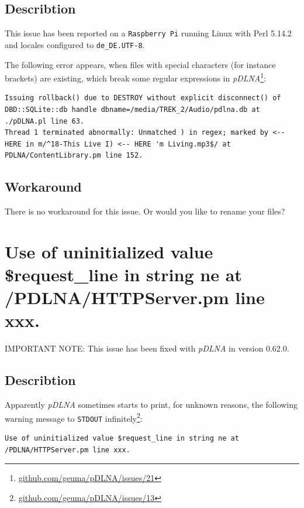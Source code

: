 \documentclass[a4paper,oneside,10pt]{report}
\newenvironment{colframeimportantnote}{%
  \begin{Sbox}
    \begin{minipage}{.99\columnwidth}
}{%
  \end{minipage}
  \end{Sbox}
  \begin{center}
    \fcolorbox{black}{Orange}{\TheSbox}
  \end{center}
}
\begin{document}
\subsection{Describtion}

This issue has been reported on a \verb|Raspberry Pi| running Linux with Perl 5.14.2 and locales configured to \verb|de_DE.UTF-8|.

The following error appears, when files with special characters (for instance brackets) are existing, which break some regular expressions in {\em pDLNA}\footnote{\url{github.com/geuma/pDLNA/issues/21}}:
\begin{lstlisting}
Issuing rollback() due to DESTROY without explicit disconnect() of DBD::SQLite::db handle dbname=/media/TREK_2/Audio/pdlna.db at ./pDLNA.pl line 63.
Thread 1 terminated abnormally: Unmatched ) in regex; marked by <-- HERE in m/^18-This Live I) <-- HERE 'm Living.mp3$/ at PDLNA/ContentLibrary.pm line 152.
\end{lstlisting}

\subsection{Workaround}

There is no workaround for this issue. Or would you like to rename your files?

\section{Use of uninitialized value \$request\_line in string ne at /PDLNA/HTTPServer.pm line xxx.}

\begin{colframeimportantnote}
\textsc{IMPORTANT NOTE:} This issue has been fixed with {\em pDLNA} in version 0.62.0.
\end{colframeimportantnote}

\subsection{Describtion}

Apparently {\em pDLNA} sometimes starts to print, for unknown reasons, the following warning message to \verb|STDOUT| infinitely\footnote{\url{github.com/geuma/pDLNA/issues/13}}:
\begin{lstlisting}
Use of uninitialized value $request_line in string ne at /PDLNA/HTTPServer.pm line xxx.
\end{lstlisting}
\end{document}
